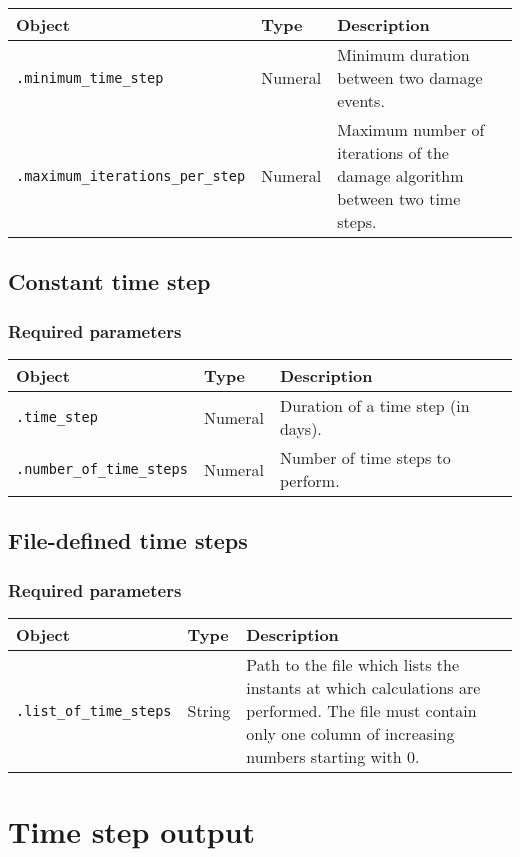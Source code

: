 \documentclass[10pt]{article}
\begin{document}
\begin{tabularx}{\textwidth}{llX}
\hline 
Object & Type & Description \\ 
\hline 
\verb+.minimum_time_step+ & Numeral & Minimum duration between two damage events. \\ 
\verb+.maximum_iterations_per_step+ & Numeral & Maximum number of iterations of the damage algorithm between two time steps.\\
\hline 
\end{tabularx}

\subsection{Constant time step}

\subsubsection*{Required parameters}

\begin{tabularx}{\textwidth}{llX}
\hline 
Object & Type & Description \\ 
\hline 
\verb+.time_step+ & Numeral & Duration of a time step (in days). \\ 
\verb+.number_of_time_steps+ & Numeral & Number of time steps to perform.\\
\hline 
\end{tabularx}

\subsection{File-defined time steps}

\subsubsection*{Required parameters}

\begin{tabularx}{\textwidth}{llX}
\hline 
Object & Type & Description \\ 
\hline 
\verb+.list_of_time_steps+ & String & Path to the file which lists the instants at which calculations are performed. The file must contain only one column of increasing numbers starting with 0.\\ 
\hline 
\end{tabularx}

\section{Time step output}
\end{document}
